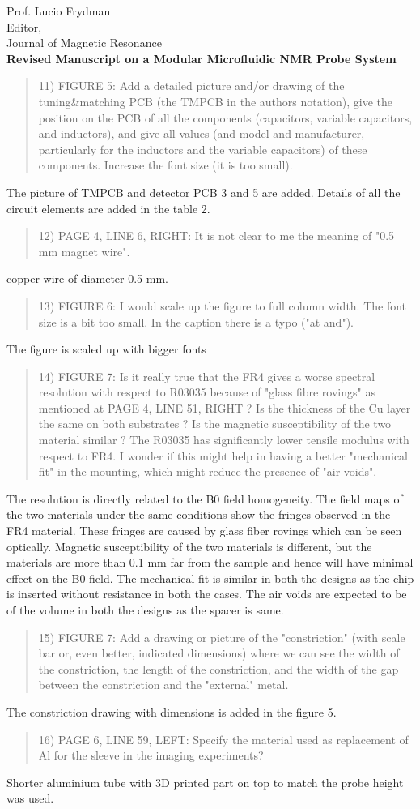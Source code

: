 \documentclass{mu-soton-letter}
\newenvironment{reviewer} {\begin{quote}\color{black!50}} {\end{quote}}
\begin{document}
\begin{letter}{Prof. Lucio Frydman\\
  Editor,\\
  Journal of Magnetic Resonance\\[2cm]
  \textbf{Revised Manuscript on a Modular Microfluidic NMR Probe System}}
\begin{reviewer}
11) FIGURE 5: Add a detailed picture and/or drawing of the tuning\&matching PCB (the TMPCB in the authors notation), give the position on the PCB of all the components (capacitors, variable capacitors, and inductors), and give all values (and model and manufacturer, particularly for the inductors and the variable capacitors) of these components. Increase the font size (it is too small).
\end{reviewer}
The picture of TMPCB and detector PCB 3 and 5 are added. Details of all the circuit elements are added in the table 2.
\begin{reviewer}
12) PAGE 4, LINE 6, RIGHT: It is not clear to me the meaning of "0.5 mm magnet wire".
\end{reviewer}
copper wire of diameter 0.5 mm.
\begin{reviewer}
13) FIGURE 6: I would scale up the figure to full column width. The font size is a bit too small. In the caption there is a typo ("at and").
\end{reviewer}
The figure is scaled up with bigger fonts
\begin{reviewer}
14) FIGURE 7: Is it really true that the FR4 gives a worse spectral resolution with respect to R03035 because of "glass fibre rovings" as mentioned at PAGE 4, LINE 51, RIGHT ? Is the thickness of the Cu layer the same on both substrates ? Is the magnetic susceptibility of the two material similar ? The R03035 has significantly lower tensile modulus with respect to FR4. I wonder if this might help in having a better "mechanical fit" in the mounting, which might reduce the presence of "air voids".
\end{reviewer}
The resolution is directly related to the B0 field homogeneity. The field maps of the two materials under the same conditions show the fringes observed in the FR4 material. These fringes are caused by glass fiber rovings which can be seen optically. Magnetic susceptibility of the two materials is different, but the materials are more than 0.1 mm far from the sample and hence will have minimal effect on the B0 field. The mechanical fit is similar in both the designs as the chip is inserted without resistance in both the cases. The air voids are expected to be of the volume in both the designs as the spacer is same.
\begin{reviewer}
15) FIGURE 7: Add a drawing or picture of the "constriction" (with scale bar or, even better, indicated dimensions) where we can see the width of the constriction, the length of the constriction, and the width of the gap between the constriction and the "external" metal.
\end{reviewer}
The constriction drawing with dimensions is added in the figure 5.
\begin{reviewer}
16) PAGE 6, LINE 59, LEFT: Specify the material used as replacement of Al for the sleeve in the imaging experiments?
\end{reviewer}
Shorter aluminium tube with 3D printed part on top to match the probe height was used.



\end{letter}
\end{document}
